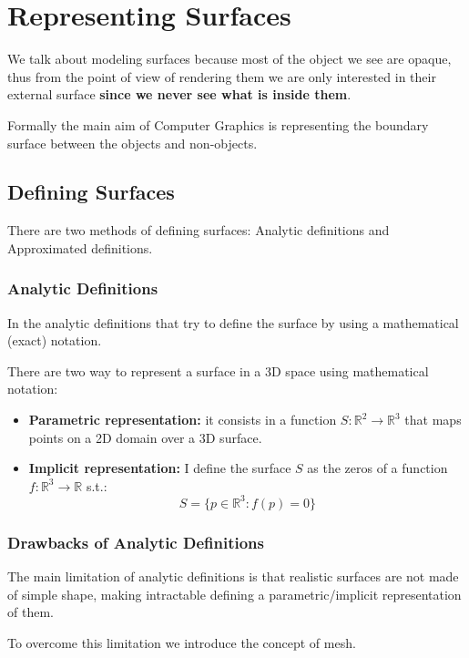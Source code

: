 \chapter{Representing Surfaces}
We talk about modeling surfaces because most of the object we see are opaque, thus from the point of view of rendering them we are only interested in their external surface \textbf{since we never see what is inside them}.\par
Formally the main aim of Computer Graphics is representing the boundary surface between the objects and non-objects.

\section{Defining Surfaces}
There are two methods of defining surfaces: Analytic definitions and Approximated definitions.

\subsection{Analytic Definitions}
In the analytic definitions that try to define the surface by using a mathematical (exact) notation.\par
There are two way to represent a surface in a 3D space using mathematical notation:
\begin{itemize}
    \item \textbf{Parametric representation:} it consists in a function $S : \mathbb{R}^{2} \rightarrow \mathbb{R}^{3}$ that maps points on a 2D domain over a 3D surface.  
    \item \textbf{Implicit representation:} I define the surface $S$ as the zeros of a function $f: \mathbb{R}^{3} \rightarrow \mathbb{R}$ s.t.:
        \begin{equation*}
            S = \{p \in \mathbb{R}^{3}: f(p) = 0\}
        \end{equation*}
\end{itemize}

\subsection{Drawbacks of Analytic Definitions}
The main limitation of analytic definitions is that realistic surfaces are not made of simple shape, making intractable defining a parametric/implicit representation of them.\par
To overcome this limitation we introduce the concept of mesh.

